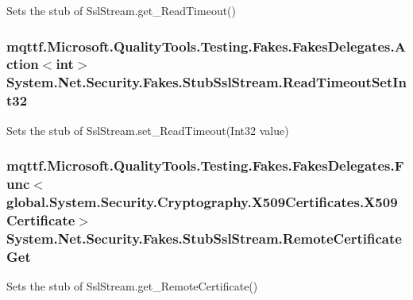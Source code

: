 Sets the stub of Ssl\-Stream.\-get\-\_\-\-Read\-Timeout()

\hypertarget{class_system_1_1_net_1_1_security_1_1_fakes_1_1_stub_ssl_stream_ab62a708cfb837b4978fbc81ba22be732}{
\subsubsection[{Read\-Timeout\-Set\-Int32}]{\setlength{\rightskip}{0pt plus 5cm}mqttf.\-Microsoft.\-Quality\-Tools.\-Testing.\-Fakes.\-Fakes\-Delegates.\-Action$<$int$>$ System.\-Net.\-Security.\-Fakes.\-Stub\-Ssl\-Stream.\-Read\-Timeout\-Set\-Int32}}\label{class_system_1_1_net_1_1_security_1_1_fakes_1_1_stub_ssl_stream_ab62a708cfb837b4978fbc81ba22be732}


Sets the stub of Ssl\-Stream.\-set\-\_\-\-Read\-Timeout(\-Int32 value)

\hypertarget{class_system_1_1_net_1_1_security_1_1_fakes_1_1_stub_ssl_stream_a7b08151be5f23f73b14260d954f58f2c}{
\subsubsection[{Remote\-Certificate\-Get}]{\setlength{\rightskip}{0pt plus 5cm}mqttf.\-Microsoft.\-Quality\-Tools.\-Testing.\-Fakes.\-Fakes\-Delegates.\-Func$<$global.\-System.\-Security.\-Cryptography.\-X509\-Certificates.\-X509\-Certificate$>$ System.\-Net.\-Security.\-Fakes.\-Stub\-Ssl\-Stream.\-Remote\-Certificate\-Get}}\label{class_system_1_1_net_1_1_security_1_1_fakes_1_1_stub_ssl_stream_a7b08151be5f23f73b14260d954f58f2c}


Sets the stub of Ssl\-Stream.\-get\-\_\-\-Remote\-Certificate()

